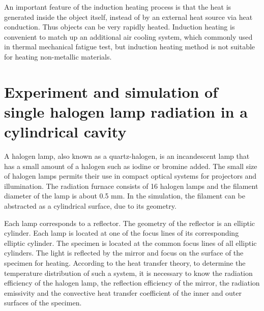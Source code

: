 An important feature of the induction heating process is that the heat is generated inside the object itself, instead of by an external heat source via heat conduction. Thus objects can be very rapidly heated.
Induction heating is convenient to match up an additional air cooling system, which commonly used in thermal mechanical fatigue test, but induction heating method is not suitable for heating non-metallic materials.




\section{Experiment and simulation of single halogen lamp radiation in a cylindrical cavity}
\noindent
A halogen lamp, also known as a quartz-halogen, is an incandescent lamp that has a small amount of a halogen such as iodine or bromine added.
The small size of halogen lamps permits their use in compact optical systems for projectors and illumination.
The radiation furnace consists of 16 halogen lamps and the filament diameter of the lamp is about 0.5 mm. In the simulation, the filament can be abstracted as a cylindrical surface, due to its geometry.

Each lamp corresponds to a reflector. The geometry of the reflector is an elliptic cylinder. Each lamp is located at one of the focus
lines of its corresponding elliptic cylinder. The specimen is located at the common focus lines of all elliptic cylinders. The light is reflected by the mirror and focus on the surface of the specimen for heating.
According to the heat transfer theory, to determine the temperature distribution of such a system, it is necessary to know the radiation efficiency of the halogen lamp, the reflection efficiency of the mirror, the radiation emissivity and the convective heat transfer coefficient of the inner and outer surfaces of the specimen.


